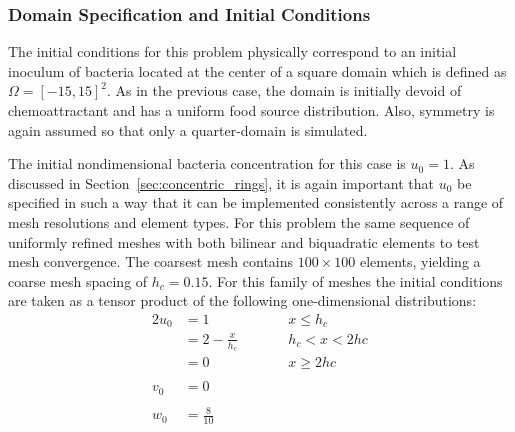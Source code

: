 \subsubsection{Domain Specification and Initial Conditions}
The initial conditions for this problem physically correspond to an initial inoculum of bacteria located at the center of a square domain which is defined as $\Omega=[-15,15]^2$.  As in the previous case, the domain is initially devoid of chemoattractant and has a uniform food source distribution. Also, symmetry is again assumed so that only a quarter-domain is simulated.

The initial nondimensional bacteria concentration for this case is $u_0=1$.  As discussed in Section~\ref{sec:concentric_rings}, it is again important that $u_0$ be specified in such a way that it can be implemented consistently across a range of mesh resolutions and element types. For this problem the same sequence of uniformly refined meshes with both bilinear and biquadratic elements to test mesh convergence.  The coarsest mesh contains $100\times100$ elements, yielding a coarse mesh spacing of $h_c=0.15$. For this family of meshes the initial conditions are taken as a tensor product of the following one-dimensional distributions:
\begin{alignat}{2}
  u_0 & = 1                 & \qquad & x \le h_c     \label{eq:u0_1_radial_spots} \\
      & = 2 - \frac{x}{h_c} & \qquad & h_c < x < 2hc \label{eq:u0_2_radial_spots} \\
      & =0                  & \qquad & x \ge 2hc     \label{eq:u0_3_radial_spots} \\
      &                     &        & \nonumber \\  
  v_0 & =0                  &        &               \label{eq:v0_radial_spots}   \\
      &                     &        & \nonumber \\  
  w_0 & =\frac{8}{10}       &        &               \label{eq:w0_radial_spots}   
\end{alignat}

